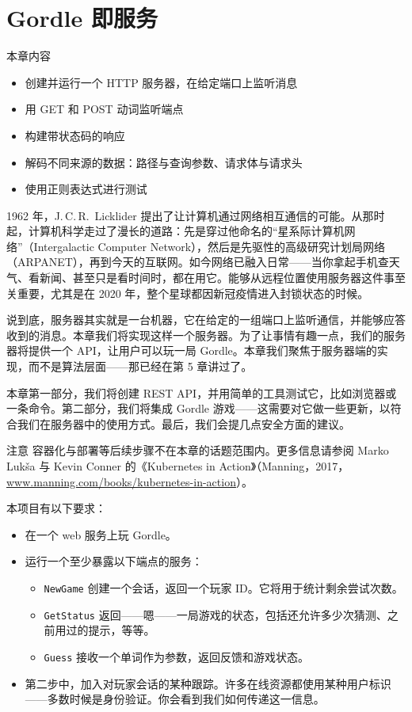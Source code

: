 \chapter{Gordle 即服务}

\begin{infobox}{本章内容}
\begin{itemize}
  \item 创建并运行一个 HTTP 服务器，在给定端口上监听消息
  \item 用 GET 和 POST 动词监听端点
  \item 构建带状态码的响应
  \item 解码不同来源的数据：路径与查询参数、请求体与请求头
  \item 使用正则表达式进行测试
\end{itemize}
\end{infobox}

1962 年，J.\,C.\,R.~Licklider 提出了让计算机通过网络相互通信的可能。从那时起，计算机科学走过了漫长的道路：先是穿过他命名的``星系际计算机网络''（Intergalactic Computer Network），然后是先驱性的高级研究计划局网络（ARPANET），再到今天的互联网。如今网络已融入日常——当你拿起手机查天气、看新闻、甚至只是看时间时，都在用它。能够从远程位置使用服务器这件事至关重要，尤其是在 2020 年，整个星球都因新冠疫情进入封锁状态的时候。

说到底，服务器其实就是一台机器，它在给定的一组端口上监听通信，并能够应答收到的消息。本章我们将实现这样一个服务器。为了让事情有趣一点，我们的服务器将提供一个 API，让用户可以玩一局 Gordle。本章我们聚焦于服务器端的实现，而不是算法层面——那已经在第 5 章讲过了。

本章第一部分，我们将创建 REST API，并用简单的工具测试它，比如浏览器或一条命令。第二部分，我们将集成 Gordle 游戏——这需要对它做一些更新，以符合我们在服务器中的使用方式。最后，我们会提几点安全方面的建议。

\begin{infobox}{注意}
容器化与部署等后续步骤不在本章的话题范围内。更多信息请参阅 Marko Luk{\PocketLatinExtendedFont š}a 与 Kevin Conner 的《Kubernetes in Action》（Manning，2017，\url{www.manning.com/books/kubernetes-in-action}）。
\end{infobox}

本项目有以下要求：

\begin{itemize}
  \item 在一个 web 服务上玩 Gordle。
  \item 运行一个至少暴露以下端点的服务：
  \begin{itemize}
    \item \texttt{NewGame} 创建一个会话，返回一个玩家 ID。它将用于统计剩余尝试次数。
    \item \texttt{GetStatus} 返回——嗯——一局游戏的状态，包括还允许多少次猜测、之前用过的提示，等等。
    \item \texttt{Guess} 接收一个单词作为参数，返回反馈和游戏状态。
  \end{itemize}
  \item 第二步中，加入对玩家会话的某种跟踪。许多在线资源都使用某种用户标识——多数时候是身份验证。你会看到我们如何传递这一信息。
\end{itemize}

